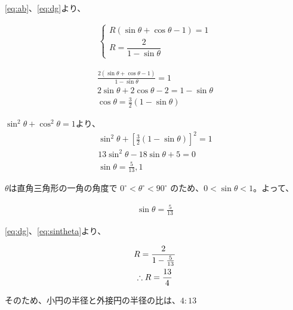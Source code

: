 \documentclass{jsarticle}
\begin{document}
\ref{eq:ab}、\ref{eq:dg}より、

\begin{gather}
 \left\{
 \begin{array}{l}
  R({\sin}{\theta} + {\cos}{\theta} - 1) = 1 \\
  R = \dfrac{2}{1 - {\sin}{\theta}}
 \end{array}
 \right.
\end{gather}

\begin{gather*}
 \frac{2({\sin}{\theta} + {\cos}{\theta} - 1)}{1 - {\sin}{\theta}} = 1 \\
 2{\sin}{\theta} + 2{\cos}{\theta} -2 = 1 - {\sin}{\theta} \\
 {\cos}{\theta} = \frac{3}{2}(1 - {\sin}{\theta})
\end{gather*}

${\sin}^2{\theta} + {\cos}^2{\theta} = 1$より、
\begin{gather*}
 {\sin}^2{\theta} + [\frac{3}{2}(1 - {\sin}{\theta})]^2 = 1 \\
 13{\sin}^2{\theta} - 18{\sin}{\theta} + 5 = 0 \\
 {\sin}{\theta} = \frac{5}{13}, 1
\end{gather*}

${\theta}$は直角三角形の一角の角度で $0^{\circ} < {\theta}^{\circ} < 90^{\circ}$ のため、$0 < {\sin}{\theta} < 1$。よって、

\begin{gather}
 {\sin}{\theta} = \frac{5}{13}     \label{eq:sintheta}
\end{gather}

\ref{eq:dg}、\ref{eq:sintheta}より、

\begin{gather}
 R = \frac{2}{1 - \frac{5}{13}} \notag \\
 \therefore R = \frac{13}{4}
\end{gather}

そのため、小円の半径と外接円の半径の比は、$4:13$
\end{document}
